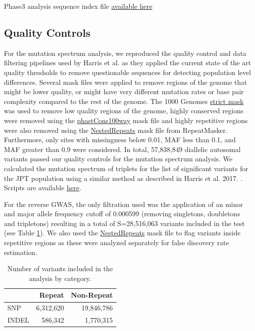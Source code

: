 \documentclass[9pt,lineno]{elife}
\begin{document}
Phase3 analysis sequence index file  \href{http://ftp.1000genomes.ebi.ac.uk/vol1/ftp/phase3/20130502.phase3.analysis.sequence.index}{available here} 

\subsection{Quality Controls}
For the mutation spectrum analysis, we reproduced the quality control and data filtering pipelines used by Harris et al. as they applied the current state of the art quality thresholds to remove questionable sequences for detecting population level differences. 
Several mask files were applied to remove regions of the genome that might be lower quality, or might have very different mutation rates or base pair complexity compared to the rest of the genome. 
The  1000 Genomes \href{http://ftp.1000genomes.ebi.ac.uk/vol1/ftp/release/20130502/supporting/accessible_genome_masks/20141020.strict_mask.whole_genome.bed}{strict mask} was used to remove low quality regions of the genome, highly conserved regions were removed using the \href{http://hgdownload.cse.ucsc.edu/goldenPath/hg19/database/phastConsElements100way.txt.gz}{phastCons100way} mask file and highly repetitive regions were also removed using the \href{http://hgdownload.cse.ucsc.edu/goldenpath/hg19/database/nestedRepeats.txt.gz}{NestedRepeats} mask file from RepeatMasker. 
Furthermore, only sites with missingness below 0.01, MAF less than 0.1, and MAF greater than 0.9 were considered.
In total, 57,838,849 diallelic autosomal variants passed our quality controls for the mutation spectrum analysis.
We calculated the mutation spectrum of triplets for the list of significant variants for the JPT population using a similar method as described in Harris et al. 2017. \citep{Harris2017a}. Scripts are available \href{https://github.com/LukeAndersonTrocme/QualityPaper}{here}. 

For the reverse GWAS, the only filtration used was the application of an minor and major allele frequency cutoff of 0.000599 (removing singletons, doubletons and tripletons) resulting in a total of S=28,516,063 variants included in the test (see Table \ref{totTable}). We also used the \href{http://hgdownload.cse.ucsc.edu/goldenpath/hg19/database/nestedRepeats.txt.gz}{NestedRepeats} mask file to flag variants inside repetitive regions as these were analyzed separately for false discovery rate estimation.

\begin{table}[h]
\begin{tabular}{l  r r}
                      & {Repeat}  & {Non-Repeat}       \\ \hline
{SNP}  & 6,312,620 & 19,846,786   \\  
{INDEL} &  586,342  & 1,770,315 \\ \hline
\end{tabular}
\caption{Number of variants included in the analysis by category.}
\label{totTable}
\end{table}
\end{document}
